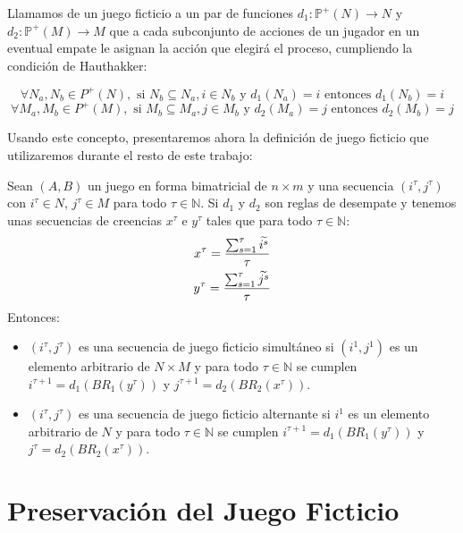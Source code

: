 \begin{definition}
    Llamamos  de un juego ficticio a un par de funciones $d_1: \mathbb{P}^+(N) \rightarrow N$ y $d_2: \mathbb{P}^+(M) \rightarrow M$ que a cada subconjunto de acciones de un jugador en un eventual empate le asignan la acción que elegirá el proceso, cumpliendo la condición de Hauthakker:

    \[
        \forall N_a, N_b \in {P}^+(N), \text{ si } N_b \subseteq N_a, i \in N_b \text{ y } d_1(N_a) = i  \text{ entonces } d_1(N_b) = i
    \]
    \[
        \forall M_a, M_b \in {P}^+(M), \text{ si } M_b \subseteq M_a, j \in M_b \text{ y } d_2(M_a) = j  \text{ entonces } d_2(M_b) = j
    \]
\end{definition}

Usando este concepto, presentaremos ahora la definición de juego ficticio que utilizaremos durante el resto de este trabajo:

\begin{definition} \label{def:fp:berger_desempate}
    Sean $(A, B)$ un juego en forma bimatricial de $n \times m$ y una secuencia $(i^\tau, j^\tau)$ con $i^\tau \in N$, $j^\tau \in M$ para todo $\tau \in \mathbb{N}$. Si $d_1$ y $d_2$ son reglas de desempate y tenemos unas secuencias de creencias $x^\tau$ e $y^\tau$ tales que para todo $\tau \in \mathbb{N}$:
    \begin{gather*}
        x^\tau= \frac{\sum^\tau_{s=1} \widetilde{i^s}}{\tau}  \\
        y^\tau= \frac{\sum^\tau_{s=1} \widetilde{j^s}}{\tau}
    \end{gather*}
    Entonces:
    \begin{itemize}
        \item $(i^\tau, j^\tau)$ es una secuencia de juego ficticio simultáneo si $(i^1, j^1)$ es un elemento arbitrario de $N \times M$ y para todo $\tau \in \mathbb{N}$ se cumplen $i^{\tau+1} = d_1(BR_1(y^\tau))$ y $j^{\tau+1} = d_2(BR_2(x^\tau))$.
        \item $(i^\tau, j^\tau)$ es una secuencia de juego ficticio alternante si $i^1$ es un elemento arbitrario de $N$ y para todo $\tau \in \mathbb{N}$ se cumplen $i^{\tau+1} = d_1(BR_1(y^\tau))$ y $j^{\tau} = d_2(BR_2(x^\tau))$.
    \end{itemize}
\end{definition}

\section{Preservación del Juego Ficticio}

